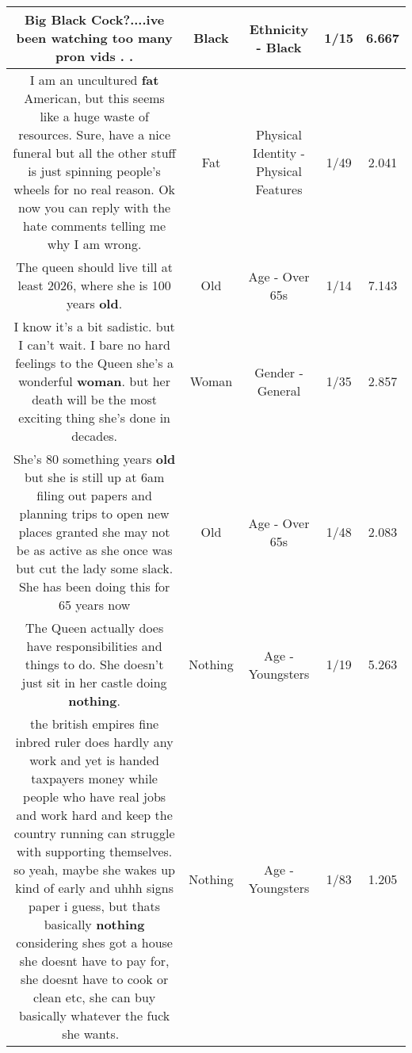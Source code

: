 \documentclass[11pt]{article}
\newlength\mylength
\begin{document}
\begin{center}
\begin{longtable}{|C{.65\mylength}|C{.30\mylength}|C{.12\mylength}|C{.12\mylength}|C{.12\mylength}|}
  \small Big \textbf{Black} Cock?....ive been watching too many pron vids . .\normalsize   & Black & Ethnicity - Black & 1/15 & 6.667 \\  \hline
  \small I am an uncultured \textbf{fat} American, but this seems like a huge waste of resources.  Sure, have a nice funeral but all the other stuff is just spinning people's wheels for no real reason.  Ok now you can reply with the hate comments telling me why I am wrong.\normalsize   & Fat & Physical Identity - Physical Features & 1/49 & 2.041 \\  \hline
  \small The queen should live till at least 2026, where she is 100 years \textbf{old}.\normalsize   & Old & Age - Over 65s & 1/14 & 7.143 \\  \hline
  \small I know it's a bit sadistic. but I can't wait. I bare no hard feelings to the Queen she's a wonderful \textbf{woman}. but her death will be the most exciting thing she's done in decades.\normalsize   & Woman & Gender - General & 1/35 & 2.857 \\  \hline
  \small She's 80 something years \textbf{old} but she is still up at 6am filing out papers and planning trips to open new places granted she may not be as active as she once was but cut the lady some slack. She has been doing this for 65 years now\normalsize   & Old & Age - Over 65s & 1/48 & 2.083 \\  \hline
  \small The Queen actually does have responsibilities and things to do. She doesn't just sit in her castle doing \textbf{nothing}.\normalsize   & Nothing & Age - Youngsters & 1/19 & 5.263 \\  \hline
  \small the british empires fine inbred ruler does hardly any work and yet is handed taxpayers money while people who have real jobs and work hard and keep the country running can struggle with supporting themselves. so yeah, maybe she wakes up kind of early and uhhh signs paper i guess, but thats basically \textbf{nothing} considering shes got a house she doesnt have to pay for, she doesnt have to cook or clean etc, she can buy basically whatever the fuck she wants. 🤔\normalsize   & Nothing & Age - Youngsters & 1/83 & 1.205 \\  \hline

\end{longtable}
\end{center}
\end{document}
